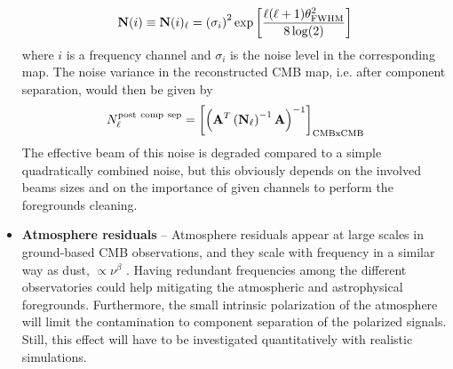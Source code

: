 \begin{itemize}
	\begin{eqnarray}
		\centering
			\mathbf{N}(i) \equiv \mathbf{N}(i)_\ell = \left( \sigma_i\right)^2\exp\left[ \frac{\ell(\ell+1)\theta_{\rm FWHM}^2}{8\log(2)} \right]
	\end{eqnarray}
	where $i$ is a frequency channel and $\sigma_i$ is the noise level in the corresponding map. The noise variance in the reconstructed CMB map, i.e. after component separation, would then be given by
	\begin{eqnarray}
		\centering
			N_\ell^{\rm post\ comp\ sep} = \left[\left(\mathbf{A}^T\left(\mathbf{N}_\ell\right)^{-1}\mathbf{A}\right)^{-1}\right]_{\rm CMBxCMB}
	\end{eqnarray}
	The effective beam of this noise is degraded compared to a simple quadratically combined noise, but this obviously depends on the involved beams sizes and on the importance of given channels to perform the foregrounds cleaning.
	\item \textbf{Atmosphere residuals} -- Atmosphere residuals appear at large scales in ground-based CMB observations, and they scale with frequency in a similar way as dust, $\propto \nu^\beta$ \cite{errard15a}. Having redundant frequencies among the different observatories could help mitigating the atmospheric and astrophysical foregrounds. Furthermore, the small intrinsic polarization of the atmosphere \cite{battistelli12,errard15a} will
limit the contamination to component separation of the polarized signals.
Still, this effect will have to be investigated quantitatively with realistic simulations.
\end{itemize}




%

